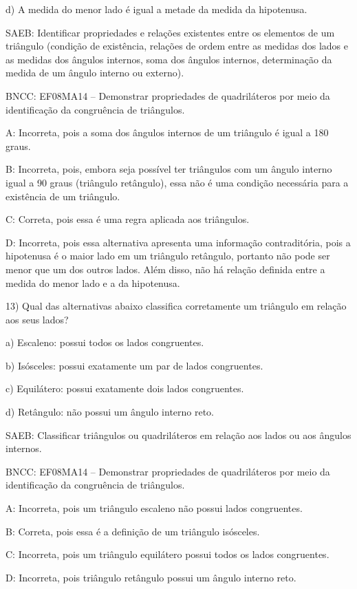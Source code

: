 d) A medida do menor lado é igual a metade da medida da hipotenusa.

SAEB: Identificar propriedades e relações existentes entre os elementos
de um triângulo (condição de existência, relações de ordem entre as
medidas dos lados e as medidas dos ângulos internos, soma dos ângulos
internos, determinação da medida de um ângulo interno ou externo).

BNCC: EF08MA14 -- Demonstrar propriedades de quadriláteros por meio da
identificação da congruência de triângulos.

A: Incorreta, pois a soma dos ângulos internos de um triângulo é igual a
180 graus.

B: Incorreta, pois, embora seja possível ter triângulos com um ângulo
interno igual a 90 graus (triângulo retângulo), essa não é uma condição
necessária para a existência de um triângulo.

C: Correta, pois essa é uma regra aplicada aos triângulos.

D: Incorreta, pois essa alternativa apresenta uma informação
contraditória, pois a hipotenusa é o maior lado em um triângulo
retângulo, portanto não pode ser menor que um dos outros lados. Além
disso, não há relação definida entre a medida do menor lado e a da
hipotenusa.

13) Qual das alternativas abaixo classifica corretamente um triângulo em
relação aos seus lados?

a) Escaleno: possui todos os lados congruentes.

b) Isósceles: possui exatamente um par de lados congruentes.

c) Equilátero: possui exatamente dois lados congruentes.

d) Retângulo: não possui um ângulo interno reto.

SAEB: Classificar triângulos ou quadriláteros em relação aos lados ou
aos ângulos internos.

BNCC: EF08MA14 -- Demonstrar propriedades de quadriláteros por meio da
identificação da congruência de triângulos.

A: Incorreta, pois um triângulo escaleno não possui lados congruentes.

B: Correta, pois essa é a definição de um triângulo isósceles.

C: Incorreta, pois um triângulo equilátero possui todos os lados
congruentes.

D: Incorreta, pois triângulo retângulo possui um ângulo interno reto.

